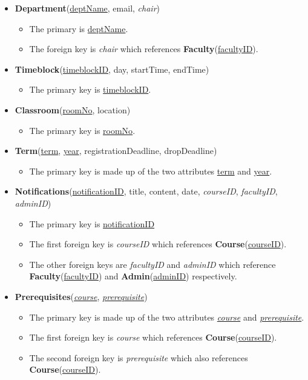 \documentclass{report}
\begin{document}
\begin{itemize}
    \item \textbf{Department}(\underline{deptName}, email, \textit{chair})
    \begin{itemize}
        \item The primary is \underline{deptName}.
        \item The foreign key is \textit{chair} which references \textbf{Faculty}(\underline{facultyID}).
    \end{itemize}

    \item \textbf{Timeblock}(\underline{timeblockID}, day, startTime, endTime)
    \begin{itemize}
        \item The primary key is \underline{timeblockID}.
    \end{itemize}

    \item \textbf{Classroom}(\underline{roomNo}, location)
    \begin{itemize}
        \item The primary key is \underline{roomNo}.
    \end{itemize}
    
    \item \textbf{Term}(\underline{term}, \underline{year}, registrationDeadline, dropDeadline)
    \begin{itemize}
        \item The primary key is made up of the two attributes \underline{term} and \underline{year}.
    \end{itemize}

    \item \textbf{Notifications}(\underline{notificationID}, title, content, date, \textit{courseID}, \textit{facultyID}, \textit{adminID})
    \begin{itemize}
        \item The primary key is \underline{notificationID}
        \item The first foreign key is \textit{courseID} which references \textbf{Course}(\underline{courseID}).
        \item The other foreign keys are \textit{facultyID} and \textit{adminID} which reference \textbf{Faculty}(\underline{facultyID}) and \textbf{Admin}(\underline{adminID}) respectively.
    \end{itemize}

    \item \textbf{Prerequisites}(\underline{\textit{course}}, \underline{\textit{prerequisite}})
    \begin{itemize}
        \item The primary key is made up of the two attributes \underline{\textit{course}} and \underline{\textit{prerequisite}}.
        \item The first foreign key is \textit{course} which references \textbf{Course}(\underline{courseID}).
        \item The second foreign key is \textit{prerequisite} which also references \textbf{Course}(\underline{courseID}).
    \end{itemize}


\end{itemize}
\end{document}
